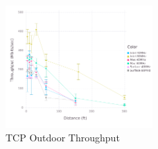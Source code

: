 \begin{figure}[!h]
\centering
\includegraphics[width=0.5\textwidth]{figures/allchip_Outside_TCP_Throughput}
\caption{TCP Outdoor Throughput}
\label{fig:outsidethru}
\end{figure}
